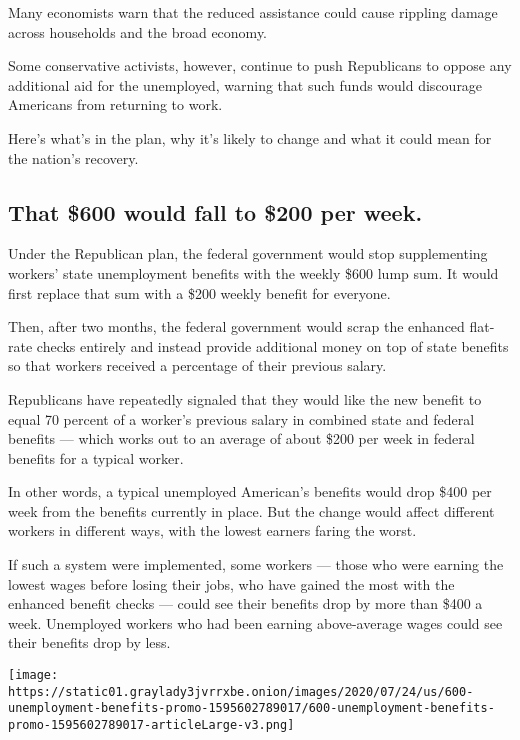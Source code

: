 Many economists warn that the reduced assistance could cause rippling
damage across households and the broad economy.

Some conservative activists, however, continue to push Republicans to
oppose any additional aid for the unemployed, warning that such funds
would discourage Americans from returning to work.

Here's what's in the plan, why it's likely to change and what it could
mean for the nation's recovery.

\hypertarget{that-600-would-fall-to-200-per-week}{%
\subsection{That \$600 would fall to \$200 per
week.}\label{that-600-would-fall-to-200-per-week}}

Under the Republican plan, the federal government would stop
supplementing workers' state unemployment benefits with the weekly \$600
lump sum. It would first replace that sum with a \$200 weekly benefit
for everyone.

Then, after two months, the federal government would scrap the enhanced
flat-rate checks entirely and instead provide additional money on top of
state benefits so that workers received a percentage of their previous
salary.

Republicans have repeatedly signaled that they would like the new
benefit to equal 70 percent of a worker's previous salary in combined
state and federal benefits --- which works out to an average of about
\$200 per week in federal benefits for a typical worker.

In other words, a typical unemployed American's benefits would drop
\$400 per week from the benefits currently in place. But the change
would affect different workers in different ways, with the lowest
earners faring the worst.

If such a system were implemented, some workers --- those who were
earning the lowest wages before losing their jobs, who have gained the
most with the enhanced benefit checks --- could see their benefits drop
by more than \$400 a week. Unemployed workers who had been earning
above-average wages could see their benefits drop by less.

\href{https://www.nytimes3xbfgragh.onion/interactive/2020/07/24/business/economy/600-unemployment-benefits.html}{}

\texttt{[image: https://static01.graylady3jvrrxbe.onion/images/2020/07/24/us/600-unemployment-benefits-promo-1595602789017/600-unemployment-benefits-promo-1595602789017-articleLarge-v3.png]}


